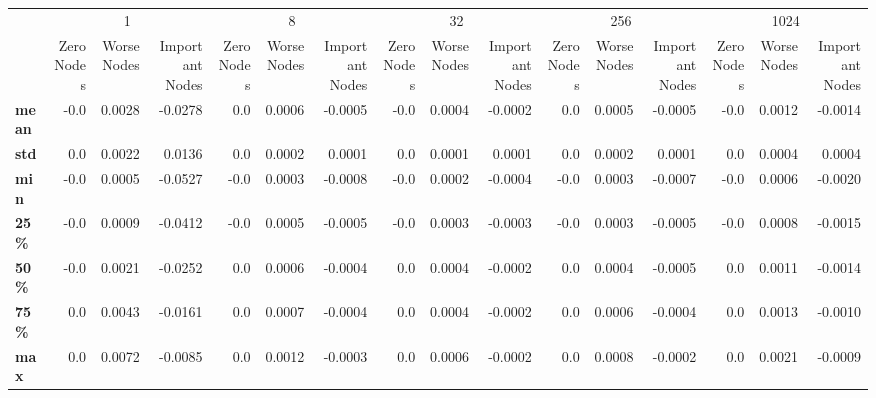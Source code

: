 \begin{tabular}{lrrrrrrrrrrrrrrr}
\toprule
{} & \multicolumn{3}{c}{1} & \multicolumn{3}{c}{8} & \multicolumn{3}{c}{32} & \multicolumn{3}{c}{256} & \multicolumn{3}{c}{1024} \\
{} & Zero Nodes & Worse Nodes & Important Nodes & Zero Nodes & Worse Nodes & Important Nodes & Zero Nodes & Worse Nodes & Important Nodes & Zero Nodes & Worse Nodes & Important Nodes & Zero Nodes & Worse Nodes & Important Nodes \\
\midrule
\textbf{mean} &       -0.0 &      0.0028 &         -0.0278 &        0.0 &      0.0006 &         -0.0005 &       -0.0 &      0.0004 &         -0.0002 &        0.0 &      0.0005 &         -0.0005 &       -0.0 &      0.0012 &         -0.0014 \\
\textbf{std } &        0.0 &      0.0022 &          0.0136 &        0.0 &      0.0002 &          0.0001 &        0.0 &      0.0001 &          0.0001 &        0.0 &      0.0002 &          0.0001 &        0.0 &      0.0004 &          0.0004 \\
\textbf{min } &       -0.0 &      0.0005 &         -0.0527 &       -0.0 &      0.0003 &         -0.0008 &       -0.0 &      0.0002 &         -0.0004 &       -0.0 &      0.0003 &         -0.0007 &       -0.0 &      0.0006 &         -0.0020 \\
\textbf{25\% } &       -0.0 &      0.0009 &         -0.0412 &       -0.0 &      0.0005 &         -0.0005 &       -0.0 &      0.0003 &         -0.0003 &       -0.0 &      0.0003 &         -0.0005 &       -0.0 &      0.0008 &         -0.0015 \\
\textbf{50\% } &       -0.0 &      0.0021 &         -0.0252 &        0.0 &      0.0006 &         -0.0004 &        0.0 &      0.0004 &         -0.0002 &        0.0 &      0.0004 &         -0.0005 &        0.0 &      0.0011 &         -0.0014 \\
\textbf{75\% } &        0.0 &      0.0043 &         -0.0161 &        0.0 &      0.0007 &         -0.0004 &        0.0 &      0.0004 &         -0.0002 &        0.0 &      0.0006 &         -0.0004 &        0.0 &      0.0013 &         -0.0010 \\
\textbf{max } &        0.0 &      0.0072 &         -0.0085 &        0.0 &      0.0012 &         -0.0003 &        0.0 &      0.0006 &         -0.0002 &        0.0 &      0.0008 &         -0.0002 &        0.0 &      0.0021 &         -0.0009 \\
\bottomrule
\end{tabular}
